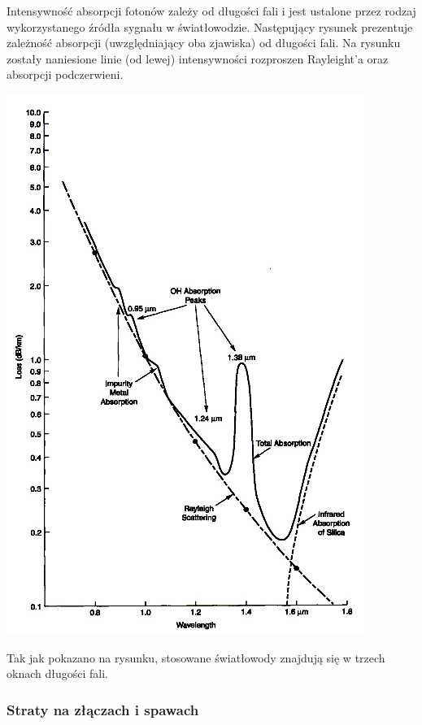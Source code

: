 \documentclass[paper=a4, fontsize=11pt]{scrartcl} %
\numberwithin{equation}{section} %
\numberwithin{figure}{section} %
\numberwithin{table}{section} %
\begin{document}
Intensywność absorpcji fotonów zależy od długości fali i jest ustalone przez rodzaj wykorzystanego źródła sygnału w światłowodzie. Następujący rysunek prezentuje
zależność absorpcji (uwzględniający oba zjawiska) od długości fali. Na rysunku zostały naniesione linie (od lewej) intensywności rozproszen Rayleight'a oraz absorpcji podczerwieni.

\includegraphics[width=\textwidth]{1}

Tak jak pokazano na rysunku, stosowane światłowody znajdują się w trzech oknach długości fali.

\subsubsection{Straty na złączach i spawach}
\end{document}

